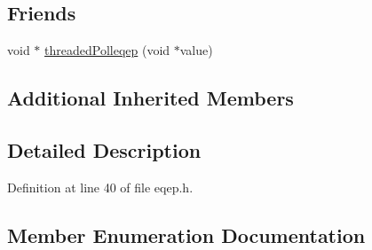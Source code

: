 \subsection*{Friends}
\begin{DoxyCompactItemize}
\item 
void $\ast$ \hyperlink{class_hardware_1_1e_q_e_p_a0dd4c4778480f930ef697f898f2d4668}{threaded\+Polleqep} (void $\ast$value)
\end{DoxyCompactItemize}
\subsection*{Additional Inherited Members}


\subsection{Detailed Description}


Definition at line 40 of file eqep.\+h.



\subsection{Member Enumeration Documentation}
\hypertarget{class_hardware_1_1e_q_e_p_a3f97f26c64d49d6f2643a257b7249070}{}
